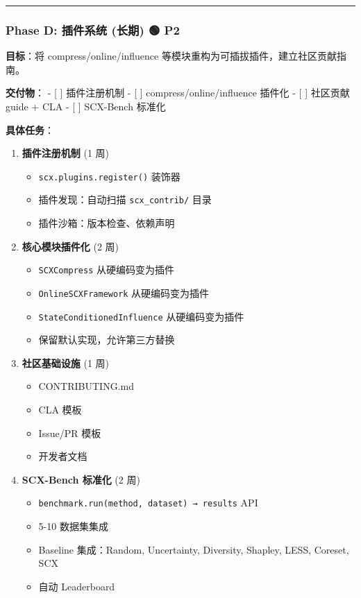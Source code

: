 \documentclass[
  12pt,
]{ctexart}
\providecommand{\tightlist}{%
  \setlength{\itemsep}{0pt}\setlength{\parskip}{0pt}}
\begin{document}
\begin{center}\rule{0.5\linewidth}{0.5pt}\end{center}

\subsubsection{Phase D: 插件系统 (长期) 🟢
P2}\label{phase-d-ux63d2ux4ef6ux7cfbux7edf-ux957fux671f-p2}

\textbf{目标}：将 compress/online/influence
等模块重构为可插拔插件，建立社区贡献指南。

\textbf{交付物}： - {[} {]} 插件注册机制 - {[} {]}
compress/online/influence 插件化 - {[} {]} 社区贡献 guide + CLA - {[}
{]} SCX-Bench 标准化

\textbf{具体任务}：

\begin{enumerate}
\def\labelenumi{\arabic{enumi}.}
\tightlist
\item
  \textbf{插件注册机制} (1 周)

  \begin{itemize}
  \tightlist
  \item
    \texttt{scx.plugins.register()} 装饰器
  \item
    插件发现：自动扫描 \texttt{scx\_contrib/} 目录
  \item
    插件沙箱：版本检查、依赖声明
  \end{itemize}
\item
  \textbf{核心模块插件化} (2 周)

  \begin{itemize}
  \tightlist
  \item
    \texttt{SCXCompress} 从硬编码变为插件
  \item
    \texttt{OnlineSCXFramework} 从硬编码变为插件
  \item
    \texttt{StateConditionedInfluence} 从硬编码变为插件
  \item
    保留默认实现，允许第三方替换
  \end{itemize}
\item
  \textbf{社区基础设施} (1 周)

  \begin{itemize}
  \tightlist
  \item
    CONTRIBUTING.md
  \item
    CLA 模板
  \item
    Issue/PR 模板
  \item
    开发者文档
  \end{itemize}
\item
  \textbf{SCX-Bench 标准化} (2 周)

  \begin{itemize}
  \tightlist
  \item
    \texttt{benchmark.run(method,\ dataset)\ →\ results} API
  \item
    5-10 数据集集成
  \item
    Baseline 集成：Random, Uncertainty, Diversity, Shapley, LESS,
    Coreset, SCX
  \item
    自动 Leaderboard
  \end{itemize}
\end{enumerate}
\end{document}
